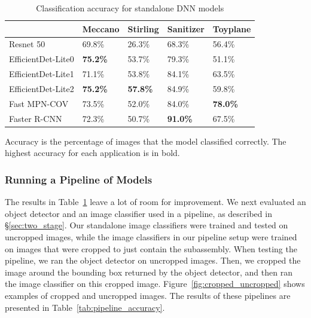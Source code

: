 \begin{table}
\begin{tabular}{|l||l|l|l|l|}
\hline
  & Meccano & Stirling & Sanitizer & Toyplane\\
  \hline
  \hline
  Resnet 50 & 69.8\% & 26.3\% & 68.3\% & 56.4\%\\
  EfficientDet-Lite0 & \textbf{75.2\%} & 53.7\% & 79.3\% & 51.1\%\\
  EfficientDet-Lite1 & 71.1\% & 53.8\% & 84.1\% & 63.5\%\\
  EfficientDet-Lite2 & \textbf{75.2\%} & \textbf{57.8\%} & 84.9\% & 59.8\%\\
  Fast MPN-COV & 73.5\% & 52.0\% & 84.0\% & \textbf{78.0\%}\\
  Faster R-CNN & 72.3\% & 50.7\% & \textbf{91.0\%} & 67.5\%\\
  \hline
\end{tabular}
\begin{captiontext}
    Accuracy is the percentage of images that the model classified correctly.
    The highest accuracy for each application is in bold.
  \end{captiontext}
  \caption{
    Classification accuracy for standalone DNN models
  }\label{tab:standalone_accuracy}
\end{table}

\subsubsection{Running a Pipeline of Models}

The results in Table~\ref{tab:standalone_accuracy} leave a lot of room for
improvement.
We next evaluated an object detector and an image classifier used in a pipeline,
as described in \S\ref{sec:two_stage}.
Our standalone image classifiers were trained and tested
on uncropped images, while the image classifiers in our pipeline setup were
trained on images that were cropped to just contain the subassembly.
When testing the pipeline, we ran the object detector on uncropped images.
Then, we cropped the image around the bounding box returned by the object
detector, and then ran the image classifier on this cropped image.
Figure~\ref{fig:cropped_uncropped} shows examples of cropped and uncropped
images.
The results of these pipelines are presented in
Table~\ref{tab:pipeline_accuracy}.

